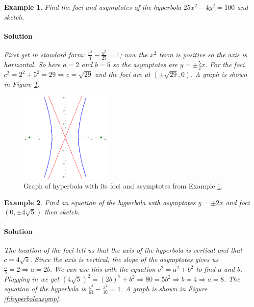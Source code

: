 \documentclass[letterpaper, 11pt, openany]{book}
\theoremstyle{mytheoremstyle}
\theoremstyle{myexamplestyle}
\newtheorem{example}{Example}[section]
\newenvironment{solution}{\paragraph{\sffamily \smaller \fontseries{b}\selectfont Solution}}{\hfill\faSquare}
\begin{document}
\begin{example}\label{e:hyperbolaeqn}
    Find the foci and asymptotes of the hyperbola $25x^{2} - 4y^{2} = 100$ and sketch.
    \begin{solution}
        First get in standard form: $\displaystyle \frac{x^{2}}{4} - \frac{y^{2}}{25} = 1$; now the $x^{2}$ term is positive so the axis is horizontal. So here $a = 2$ and $b = 5$ so the asymptotes are $y = \pm \frac{5}{2}x$. For the foci $c^2 = 2^{2} + 5^{2} = 29  \Rightarrow c = \sqrt{29}$ and the foci are at $(\pm \sqrt{29}, 0)$. A graph is shown in Figure \ref{f:hyperbolaeqn}.
    \end{solution}
\end{example}

\begin{figure}[htbp]
    \centering
        \includegraphics[width=0.4\textwidth]{Figures/hyperbolaeqn.pdf}
    \caption{Graph of hyperbola with its foci and asymptotes from Example \ref{e:hyperbolaeqn}.}
    \label{f:hyperbolaeqn}
\end{figure}

\begin{example}\label{e:hyperbolaasymp}
    Find an equation of the hyperbola with asymptotes $y = \pm 2x$ and foci $\left(0, \pm 4\sqrt{5}\right)$ then sketch.
    \begin{solution}
        The location of the foci tell us that the axis of the hyperbola is vertical and that $c = 4\sqrt{5}$. Since the axis is vertical, the slope of the asymptotes gives us $\frac{a}{b} = 2 \Rightarrow a = 2b$. We can use this with the equation $c^{2} = a^{2} + b^{2}$ to find $a$ and $b$. Plugging in we get $(4\sqrt{5})^{2} = (2b)^{2} + b^{2} \Rightarrow 80 = 5b^{2} \Rightarrow b = 4 \Rightarrow a = 8$. The equation of the hyperbola is $\displaystyle \frac{y^{2}}{64} - \frac{x^{2}}{16} = 1$. A graph is shown in Figure \ref{f:hyperbolaasymp}.
    \end{solution}
\end{example}
\end{document}
